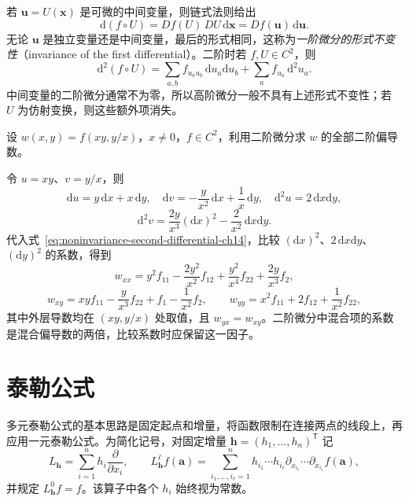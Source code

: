 \documentclass[UTF8,12pt,a4paper,fontset=fandol]{ctexbook}
\begin{document}
若 $\boldsymbol u=U(\boldsymbol x)$ 是可微的中间变量，则链式法则给出
\[
    \mathrm d(f\circ U)=Df(U)\,DU\,\mathrm d\boldsymbol x
        =Df(\boldsymbol u)\,\mathrm d\boldsymbol u.
\]
无论 $\boldsymbol u$ 是独立变量还是中间变量，最后的形式相同，这称为\emph{一阶微分的形式不变性}（invariance of the first differential）。二阶时若 $f,U\in C^2$，则
\begin{equation}
\label{eq:noninvariance-second-differential-ch14}
    \mathrm d^2(f\circ U)
    =\sum_{a,b}f_{u_au_b}\,\mathrm du_a\mathrm du_b
       +\sum_a f_{u_a}\,\mathrm d^2u_a.
\end{equation}
中间变量的二阶微分通常不为零，所以高阶微分一般不具有上述形式不变性；若 $U$ 为仿射变换，则这些额外项消失。

\begin{example}
\label{ex:second-partials-by-differentials-ch14}
设 $w(x,y)=f(xy,y/x)$，$x\ne0$，$f\in C^2$，利用二阶微分求 $w$ 的全部二阶偏导数。
\end{example}
\begin{solve}
令 $u=xy$、$v=y/x$，则
\[
    \mathrm du=y\,\mathrm dx+x\,\mathrm dy,\quad
    \mathrm dv=-\frac{y}{x^2}\,\mathrm dx+\frac1x\,\mathrm dy,
    \quad\mathrm d^2u=2\,\mathrm dx\mathrm dy,
\]
\[
    \mathrm d^2v=\frac{2y}{x^3}(\mathrm dx)^2
       -\frac2{x^2}\,\mathrm dx\mathrm dy.
\]
代入式~\eqref{eq:noninvariance-second-differential-ch14}，比较 $(\mathrm dx)^2$、$2\,\mathrm dx\mathrm dy$、$(\mathrm dy)^2$ 的系数，得到
\[
    w_{xx}=y^2f_{11}-\frac{2y^2}{x^2}f_{12}
       +\frac{y^2}{x^4}f_{22}+\frac{2y}{x^3}f_2,
\]
\[
    w_{xy}=xyf_{11}-\frac{y}{x^3}f_{22}+f_1-\frac1{x^2}f_2,
    \qquad
    w_{yy}=x^2f_{11}+2f_{12}+\frac1{x^2}f_{22},
\]
其中外层导数均在 $(xy,y/x)$ 处取值，且 $w_{yx}=w_{xy}$。二阶微分中混合项的系数是混合偏导数的两倍，比较系数时应保留这一因子。
\end{solve}

\section{泰勒公式}
\label{sec:multivariable-taylor-formula}


多元泰勒公式的基本思路是固定起点和增量，将函数限制在连接两点的线段上，再应用一元泰勒公式。为简化记号，对固定增量 $\boldsymbol h=(h_1,\ldots,h_n)^{\mathsf T}$ 记
\[
    L_{\boldsymbol h}=\sum_{i=1}^n h_i\frac{\partial}{\partial x_i},\qquad
    L_{\boldsymbol h}^{\ell}f(\boldsymbol a)
    =\sum_{i_1,\ldots,i_\ell=1}^n
       h_{i_1}\cdots h_{i_\ell}
       \partial_{x_{i_\ell}}\cdots\partial_{x_{i_1}}f(\boldsymbol a),
\]
并规定 $L_{\boldsymbol h}^0f=f$。该算子中各个 $h_i$ 始终视为常数。
\end{document}
